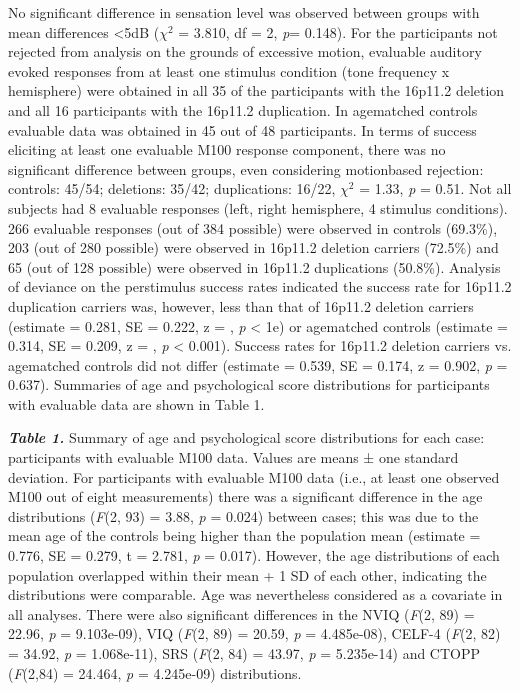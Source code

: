 \documentclass{article}
\begin{document}
No significant difference in sensation level was observed between groups with mean differences \textless 5dB ($\chi^2$ = 3.810, df = 2, \emph{p}= 0.148).  For the participants not rejected from analysis on the grounds of excessive motion, evaluable auditory evoked responses from at least one stimulus condition (tone frequency x hemisphere) were obtained in all 35 of the participants with the 16p11.2 deletion and all 16 participants with the 16p11.2 duplication. In age\-matched controls evaluable data was obtained in 45 out of 48 participants. In terms of success eliciting at least one evaluable M100 response component, there was no significant difference between groups, even considering motion\-based rejection: controls: 45/54; deletions: 35/42; duplications: 16/22, $\chi^2$ = 1.33, \emph{p} = 0.51. Not all subjects had 8 evaluable responses (left, right hemisphere, 4 stimulus conditions). 266 evaluable responses (out of 384 possible) were observed in controls (69.3\%), 203 (out of 280 possible) were observed in 16p11.2 deletion carriers (72.5\%) and 65 (out of 128 possible) were observed in 16p11.2 duplications (50.8\%). Analysis of deviance on the per\-stimulus success rates indicated the success rate for 16p11.2 duplication carriers was, however, less than that of 16p11.2 deletion carriers (estimate = 0.281, SE = 0.222, z = , \emph{p} <  1e) or age\-matched controls (estimate = 0.314, SE = 0.209, z = , \emph{p} < 0.001). Success rates for 16p11.2 deletion carriers vs. age\-matched controls did not differ (estimate = 0.539, SE = 0.174, z = 0.902, \emph{p} = 0.637). Summaries of age and psychological score distributions for participants with evaluable data are shown in Table 1.



\bigskip



\emph{\textbf{Table 1.}} Summary of age and psychological score distributions for each case: participants with evaluable M100 data.  Values are means ± one standard deviation.  For participants with evaluable M100 data (i.e., at least one observed M100 out of eight measurements) there was a significant difference in the age distributions (\emph{F}(2, 93) = 3.88, \emph{p} = 0.024) between cases; this was due to the mean age of the controls being higher than the population mean (estimate = 0.776, SE = 0.279, t = 2.781, \emph{p} = 0.017). However, the age distributions of each population overlapped within their mean + 1 SD of each other, indicating the distributions were comparable.  Age was nevertheless considered as a covariate in all analyses. There were also significant differences in the NVIQ (\emph{F}(2, 89) = 22.96, \emph{p} = 9.103e-09), VIQ (\emph{F}(2, 89) = 20.59, \emph{p} = 4.485e-08), CELF-4 (\emph{F}(2, 82) = 34.92, \emph{p} = 1.068e-11), SRS (\emph{F}(2, 84) = 43.97, \emph{p} = 5.235e-14) and CTOPP (\emph{F}(2,84) = 24.464, \emph{p} = 4.245e-09) distributions.  
\end{document}
